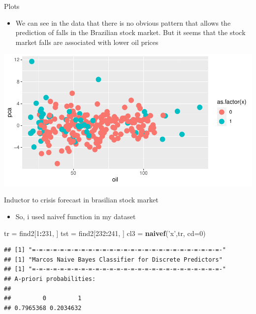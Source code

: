 \documentclass[
  10pt,
  ignorenonframetext,
]{beamer}
\newenvironment{Shaded}{\begin{snugshade}}{\end{snugshade}}
\newcommand{\DataTypeTok}[1]{\textcolor[rgb]{0.13,0.29,0.53}{#1}}
\newcommand{\DecValTok}[1]{\textcolor[rgb]{0.00,0.00,0.81}{#1}}
\newcommand{\KeywordTok}[1]{\textcolor[rgb]{0.13,0.29,0.53}{\textbf{#1}}}
\newcommand{\NormalTok}[1]{#1}
\newcommand{\OperatorTok}[1]{\textcolor[rgb]{0.81,0.36,0.00}{\textbf{#1}}}
\newcommand{\StringTok}[1]{\textcolor[rgb]{0.31,0.60,0.02}{#1}}
\providecommand{\tightlist}{%
  \setlength{\itemsep}{0pt}\setlength{\parskip}{0pt}}
\begin{document}
\begin{frame}{Plots}
\protect\hypertarget{plots-3}{}

\begin{itemize}
\tightlist
\item
  We can see in the data that there is no obvious pattern that allows
  the prediction of falls in the Brazilian stock market. But it seems
  that the stock market falls are associated with lower oil prices
\end{itemize}

\includegraphics{MJ_Ribeiro_files/figure-beamer/unnamed-chunk-29-1.pdf}

\end{frame}

\begin{frame}[fragile]{Inductor to crisis forecast in brasilian stock
market}
\protect\hypertarget{inductor-to-crisis-forecast-in-brasilian-stock-market}{}

\begin{itemize}
\tightlist
\item
  So, i used naivef function in my dataset
\end{itemize}

\begin{Shaded}
\begin{Highlighting}[]
\NormalTok{tr =}\StringTok{ }\NormalTok{find2[}\DecValTok{1}\OperatorTok{:}\DecValTok{231}\NormalTok{, ]}
\NormalTok{tst =}\StringTok{ }\NormalTok{find2[}\DecValTok{232}\OperatorTok{:}\DecValTok{241}\NormalTok{, ]}
\NormalTok{cl3 =}\StringTok{ }\KeywordTok{naivef}\NormalTok{(}\StringTok{'x'}\NormalTok{,tr, }\DataTypeTok{cd=}\DecValTok{0}\NormalTok{)}
\end{Highlighting}
\end{Shaded}

\begin{verbatim}
## [1] "=-=-=-=-=-=-=-=-=-=-=-=-=-=-=-=-=-=-=-=-=-=-=-=-=-=-=-"
## [1] "Marcos Naive Bayes Classifier for Discrete Predictors"
## [1] "=-=-=-=-=-=-=-=-=-=-=-=-=-=-=-=-=-=-=-=-=-=-=-=-=-=-=-"
## A-priori probabilities:
## 
##         0         1 
## 0.7965368 0.2034632
\end{verbatim}

\end{frame}
\end{document}
